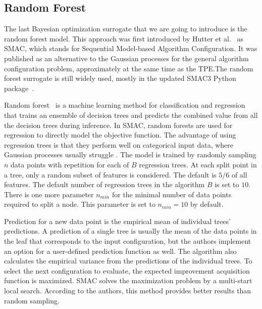 \subsection{Random Forest}
The last Bayesian optimization surrogate that we are going to introduce is the random forest model. This approach was first introduced by Hutter et al.~\cite{hutter2010sequential} as SMAC, which stands for Sequential Model-based Algorithm Configuration. It was published as an alternative to the Gaussian processes for the general algorithm configuration problem, approximately at the same time as the TPE.\@ The random forest surrogate is still widely used, mostly in the updated SMAC3 Python package~\cite{smac3}.

Random forest~\cite{breiman2001random} is a machine learning method for classification and regression that trains an ensemble of decision trees and predicts the combined value from all the decision trees during inference. In SMAC, random forests are used for regression to directly model the objective function. The advantage of using regression trees is that they perform well on categorical input data, where Gaussian processes usually struggle . The model is trained by randomly sampling $n$ data points with repetition for each of $B$ regression trees. At each split point in a tree, only a random subset of features is considered. The default is $5/6$ of all features. The default number of regression trees in the algorithm $B$ is set to $10$. There is one more parameter $n_{min}$ for the minimal number of data points required to split a node. This parameter is set to $n_{min}=10$ by default.

Prediction for a new data point is the empirical mean of individual trees' predictions. A prediction of a single tree is usually the mean of the data points in the leaf that corresponds to the input configuration, but the authors implement an option for a user-defined prediction function as well. The algorithm also calculates the empirical variance from the predictions of the individual trees. To select the next configuration to evaluate, the expected improvement acquisition function is maximized. SMAC solves the maximization problem by a multi-start local search. According to the authors, this method provides better results than random sampling.



